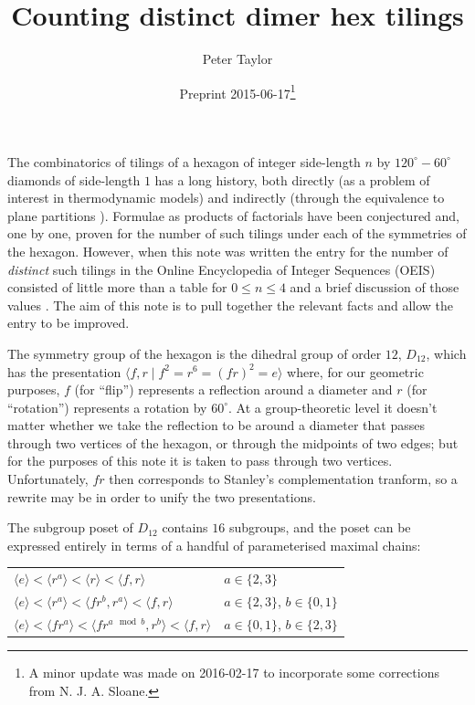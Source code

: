 \documentclass[11pt,a4paper]{article}
\title{Counting distinct dimer hex tilings}
\author{Peter Taylor}
\date{Preprint 2015-06-17\footnote{A minor update was made on 2016-02-17 to incorporate some corrections from N. J. A. Sloane.}}
\theoremstyle{remark}
\begin{document}
\maketitle

The combinatorics of tilings of a hexagon of integer side-length $n$ by $120^\circ-60^\circ$ diamonds of side-length $1$ has a long history, both directly (as a problem of interest in thermodynamic models) and indirectly (through the equivalence to plane partitions \cite{David89}). Formulae as products of factorials have been conjectured and, one by one, proven for the number of such tilings under each of the symmetries of the hexagon. However, when this note was written the entry for the number of \textit{distinct} such tilings in the Online Encyclopedia of Integer Sequences (OEIS) consisted of little more than a table for $0 \le n \le 4$ and a brief discussion of those values \cite{A066931}. The aim of this note is to pull together the relevant facts and allow the entry to be improved.

The symmetry group of the hexagon is the dihedral group of order $12$, $D_{12}$, which has the presentation $\langle f, r \mid f^2 = r^6 = (fr)^2 = e\rangle$ where, for our geometric purposes, $f$ (for ``flip'') represents a reflection around a diameter and $r$ (for ``rotation'') represents a rotation by $60^\circ$. At a group-theoretic level it doesn't matter whether we take the reflection to be around a diameter that passes through two vertices of the hexagon, or through the midpoints of two edges; but for the purposes of this note it is taken to pass through two vertices. Unfortunately, $fr$ then corresponds to Stanley's complementation tranform, so a rewrite may be in order to unify the two presentations.

The subgroup poset of $D_{12}$ contains $16$ subgroups, and the poset can be expressed entirely in terms of a handful of parameterised maximal chains:

\begin{tabular}{ll}
$\langle e\rangle < \langle r^a \rangle < \langle r \rangle < \langle f, r \rangle$ & $a \in \{2, 3\}$ \\
$\langle e\rangle < \langle r^a \rangle < \langle fr^b, r^a \rangle < \langle f, r \rangle$ & $a \in \{2, 3\}$, $b \in \{0, 1\}$ \\
$\langle e\rangle < \langle fr^a \rangle < \langle fr^{a \mod b}, r^b \rangle < \langle f, r \rangle$ & $a \in \{0, 1\}$, $b \in \{2, 3\}$
\end{tabular}
\end{document}
